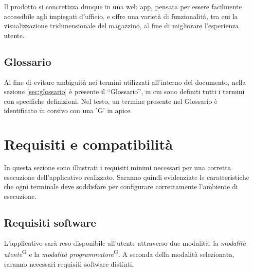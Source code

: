     Il prodotto si concretizza dunque in una web app, pensata per essere facilmente accessibile agli impiegati d'ufficio, e offre una varietà di funzionalità, tra cui la visualizzazione tridimensionale del magazzino, al fine di migliorare l'esperienza utente.

\subsection{Glossario}
Al fine di evitare ambiguità nei termini utilizzati all’interno del documento, nella sezione \ref{sec:glossario} è presente il ``Glossario'',  in cui sono definiti tutti i termini con specifiche definizioni. Nel testo, un termine presente nel Glossario è identificato in corsivo con una ’G’ in apice.
\newpage


\section{Requisiti e compatibilità}\label{sec:requisiti_e_compatibilità}
    In questa sezione sono illustrati i requisiti minimi necessari per una corretta esecuzione dell'applicativo realizzato. Saranno quindi evidenziate le caratteristiche 
    che ogni terminale deve soddisfare per configurare correttamente l'ambiente di esecuzione.

    \subsection{Requisiti software}\label{sec:requisiti_e_compatibilità:software}
    L'applicativo sarà reso disponibile all'utente attraverso due modalità: la \textit{modalità utente}\textsuperscript{G} e la \textit{modalità programmatore}\textsuperscript{G}.
    A seconda della modalità selezionata, saranno necessari requisiti software distinti.

